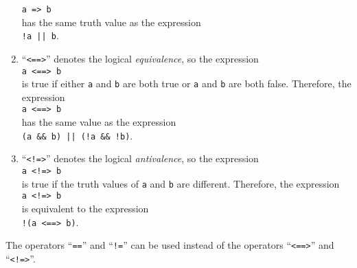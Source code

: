 \begin{enumerate}
      \texttt{a => b}
      \\[0.2cm]
      has the same truth value as the expression
      \\[0.2cm]
      \hspace*{1.3cm}
      \texttt{!a || b}.
\item ``\texttt{<==>}'' denotes the logical \emph{equivalence},
      so the expression
      \\[0.2cm]
      \hspace*{1.3cm}
      \texttt{a <==> b}
      \\[0.2cm]
      is true if either  \texttt{a} and \texttt{b} are both true or \texttt{a} and
      \texttt{b} are both false. Therefore,  the expression 
      \\[0.2cm]
      \hspace*{1.3cm}
      \texttt{a <==> b}
      \\[0.2cm]
      has the same value as the expression
      \\[0.2cm]
      \hspace*{1.3cm}
      \texttt{(a \&\& b) || (!a \&\& !b)}.
\item ``\texttt{<!=>}'' denotes the logical \emph{antivalence},
      so the expression
      \\[0.2cm]
      \hspace*{1.3cm}
      \texttt{a <!=> b}
      \\[0.2cm]
      is true if the truth values of \texttt{a} and \texttt{b} are different.
      Therefore,  the expression 
      \\[0.2cm]
      \hspace*{1.3cm}
      \texttt{a <!=> b}
      \\[0.2cm]
      is equivalent to the expression
      \\[0.2cm]
      \hspace*{1.3cm}
      \texttt{!(a <==> b)}.
\end{enumerate}
The operators ``\texttt{==}'' and ``\texttt{!=}'' can be used instead of the operators
``\texttt{<==>}'' and ``\texttt{<!=>}''. 

